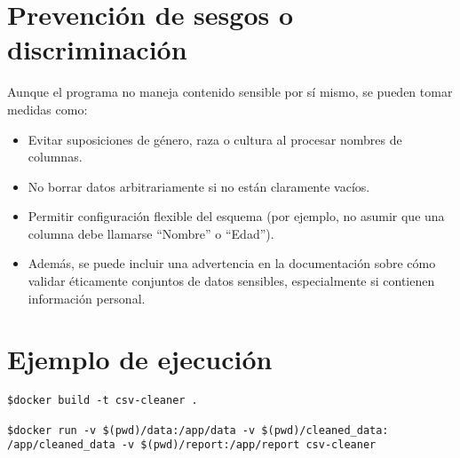 \documentclass[10pt]{article}
\begin{document}
\section*{Prevención de sesgos o discriminación}
Aunque el programa no maneja contenido sensible por sí mismo, se pueden tomar medidas como:

\begin{itemize}
    \item Evitar suposiciones de género, raza o cultura al procesar nombres de columnas.
    \item No borrar datos arbitrariamente si no están claramente vacíos.
    \item Permitir configuración flexible del esquema (por ejemplo, no asumir que una columna debe llamarse “Nombre” o “Edad”).
    \item Además, se puede incluir una advertencia en la documentación sobre cómo validar éticamente conjuntos de datos sensibles, especialmente si contienen información personal.
\end{itemize}

\section*{Ejemplo de ejecución}
\begin{verbatim}
$docker build -t csv-cleaner .

$docker run -v $(pwd)/data:/app/data -v $(pwd)/cleaned_data:
/app/cleaned_data -v $(pwd)/report:/app/report csv-cleaner
\end{verbatim}
\end{document}
